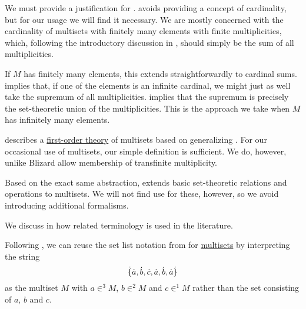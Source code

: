 \begin{comments}
  \item We must provide a justification for .  avoids providing a concept of cardinality, but for our usage we will find it necessary. We are mostly concerned with the cardinality of multisets with finitely many elements with finite multiplicities, which, following the introductory discussion in , should simply be the sum of all multiplicities.

  If \( M \) has finitely many elements, this extends straightforwardly to cardinal sums.  implies that, if one of the elements is an infinite cardinal, we might just as well take the supremum of all multiplicities.  implies that the supremum is precisely the set-theoretic union of the multiplicities. This is the approach we take when \( M \) has infinitely many elements.

  \item {} describes a \hyperref[def:first_order_theory]{first-order theory} of multisets based on generalizing \hyperref[def:zfc]{}. For our occasional use of multisets, our simple definition is sufficient. We do, however, unlike Blizard allow membership of transfinite multiplicity.

  \item Based on the exact same abstraction,  extends basic set-theoretic relations and operations to multisets. We will not find use for these, however, so we avoid introducing additional formalisms.

  \item We discuss in  how related terminology is used in the literature.
\end{comments}

\begin{remark}\label{rem:syntax_of_multisets}
  Following , we can reuse the set list notation from  for \hyperref[def:multiset]{multisets} by interpreting the string
  \begin{equation*}
    \dot{\lbrace}{ {\dot{a}}, {\dot{b}}, {\dot{c}}, {\dot{a}}, {\dot{b}}, {\dot{a}} \dot{\rbrace}}
  \end{equation*}
  as the multiset \( M \) with \( a \in^3 M \), \( b \in^2 M \) and \( c \in^1 M \) rather than the set consisting of \( a \), \( b \) and \( c \).
\end{remark}

